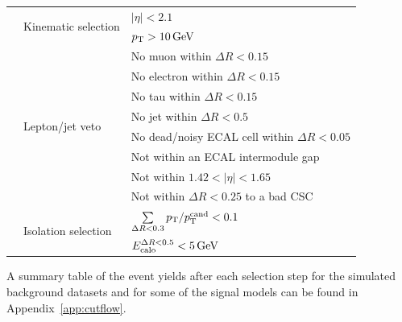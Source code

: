 \begin{table}[!h]
{\begin{tabular}{l|l|l}
                                                              &  \multirow{2}{*}{Kinematic selection}      & $|\eta|<2.1$ \\
                                                              &                                            & $p_{\text{T}}>10\,\text{Ge}\kern-0.06667em\text{V}$ \\\cmidrule{2-3}

                                                              &  \multirow{8}{*}{Lepton/jet veto}          & No muon within $\Delta R<0.15$ \\
                                                              &                                            & No electron within $\Delta R<0.15$ \\
                                                              &                                            & No tau within $\Delta R<0.15$ \\
                                                              &                                            & No jet within $\Delta R<0.5$ \\
                                                              &                                            & No dead/noisy ECAL cell within $\Delta R<0.05$  \\
                                                              &                                            & Not within an ECAL intermodule gap  \\
                                                              &                                            & Not within $1.42<|\eta|<1.65$ \\
                                                              &                                            & Not within $\Delta R<0.25$ to a bad CSC \\\cmidrule{2-3}

                                                              &  \multirow{2}{*}{Isolation selection}      & $\sum \limits_{\Delta R < 0.3} p_{\text{T}}/p_{\text{T}}^{\text{cand}} < 0.1$ \\
                                                              &                                            & $E^{\Delta R<0.5}_{\text{calo}}<5\,\text{Ge}\kern-0.06667em\text{V}$ \\


\bottomrule
\end{tabular}}
\end{table}  
A summary table of the event yields after each selection step for the simulated background datasets and for some of the signal models can be found in Appendix~\ref{app:cutflow}.\\


